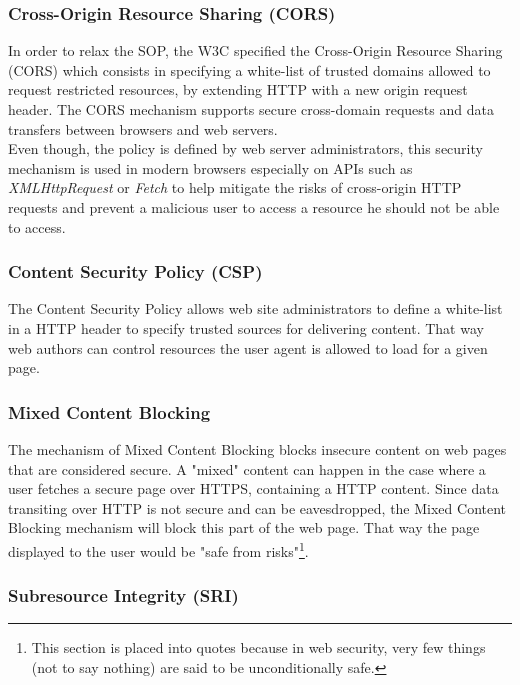 \documentclass[journal]{IEEEtran}
\begin{document}
\subsubsection{Cross-Origin Resource Sharing (CORS)}
\label{CORSSection}

In order to relax the SOP, the W3C specified the Cross-Origin Resource Sharing (CORS) which consists in specifying a white-list of trusted domains allowed to request restricted resources, by extending HTTP with a new origin request header. The CORS mechanism supports secure cross-domain requests and data transfers between browsers and web servers. \\

Even though, the policy is defined by web server administrators, this security mechanism is used in modern browsers especially on APIs such as \emph{XMLHttpRequest} or \emph{Fetch} to help mitigate the risks of cross-origin HTTP requests and prevent a malicious user to access a resource he should not be able to access.

\subsubsection{Content Security Policy (CSP)}

The Content Security Policy allows web site administrators to define a white-list in a HTTP header to specify trusted sources for delivering content. That way web authors can control resources the user agent is allowed to load for a given page.

\subsubsection{Mixed Content Blocking}

The mechanism of Mixed Content Blocking blocks insecure content on web pages that are considered secure. A "mixed" content can happen in the case where a user fetches a secure page over HTTPS, containing a HTTP content. Since data transiting over HTTP is not secure and can be eavesdropped, the Mixed Content Blocking mechanism will block this part of the web page. That way the page displayed to the user would be "safe from risks"\footnote{This section is placed into quotes because in web security, very few things (not to say nothing) are said to be unconditionally safe.}.

\subsubsection{Subresource Integrity (SRI)}
\end{document}
